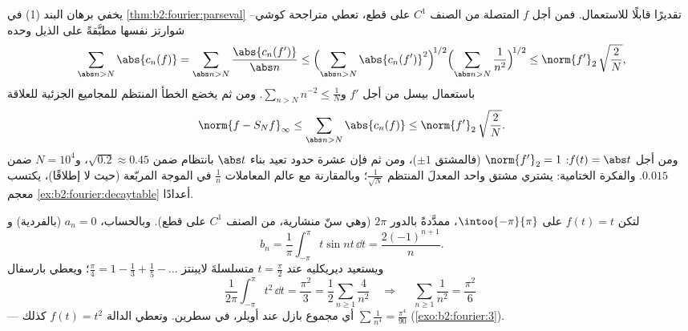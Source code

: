 \begin{example}\label{ex:b2:fourier:tailbound}
يخفي برهان البند (1) في \cref{thm:b2:fourier:parseval} تقديرًا
قابلًا للاستعمال. فمن أجل $f$ المتصلة من الصنف $C^1$ على قطع، تعطي متراجحة
كوشي--شوارتز نفسها مطبَّقةً على الذيل وحده
\[
\sum_{\abs n > N}\abs{c_n(f)}
= \sum_{\abs n > N}\frac{\abs{c_n(f')}}{\abs n}
\leq \Bigl(\sum_{\abs n > N}\abs{c_n(f')}^2\Bigr)^{\!1/2}
\Bigl(\sum_{\abs n>N}\frac{1}{n^2}\Bigr)^{\!1/2}
\leq \norm{f'}_2\,\sqrt{\frac{2}{N}} ,
\]
باستعمال بيسل من أجل $f'$ و$\sum_{n>N}n^{-2} \leq \frac1N$. ومن ثم
يخضع الخطأ المنتظم للمجاميع الجزئية للعلاقة
\[
\norm{f - S_Nf}_\infty
\leq \sum_{\abs n>N}\abs{c_n(f)}
\leq \norm{f'}_2\,\sqrt{\frac2N} .
\]
ومن أجل $f(t) = \abs t$: $\norm{f'}_2 = 1$ (فالمشتق
$\pm1$)، ومن ثم فإن عشرة حدود تعيد بناء $\abs t$ بانتظام
ضمن $\sqrt{0.2} \approx 0.45$، و$N = 10^4$ ضمن
$0.015$. والفكرة الختامية: يشتري مشتق واحد المعدلَ
المنتظم $\frac{1}{\sqrt N}$؛ وبالمقارنة مع عالم المعاملات
$\frac1n$ في الموجة المربّعة (حيث لا  إطلاقًا)،
يكتسب معجم \cref{ex:b2:fourier:decaytable} أعدادًا.
\end{example}

\begin{example}\label{ex:b2:fourier:basel}
لتكن $f(t) = t$ على $\intoo{-\pi}{\pi}$، ممدَّدةً بالدور $2\pi$
(وهي سنّ منشارية، من الصنف $C^1$ على قطع). وبالحساب، $a_n = 0$ (بالفردية) و
\[
b_n = \frac{1}{\pi}\int_{-\pi}^{\pi} t\sin nt\,\dd t
= \frac{2(-1)^{n+1}}{n} .
\]
ويستعيد ديريكليه عند $t = \frac\pi2$ متسلسلةَ لايبنتز $\frac\pi4 = 1 -
\frac13 + \frac15 - \dots$؛ ويعطي بارسفال
\[
\frac{1}{2\pi}\int_{-\pi}^{\pi} t^2\,\dd t = \frac{\pi^2}{3}
= \frac12\sum_{n\geq1}\frac{4}{n^2}
\quad\Longrightarrow\quad
\boxed{\;\sum_{n\geq1}\frac{1}{n^2} = \frac{\pi^2}{6}\;}
\]
--- أي مجموع بازل عند أويلر، في سطرين. وتعطي الدالة $f(t) = t^2$
كذلك $\sum \frac1{n^4} = \frac{\pi^4}{90}$
(\cref{exo:b2:fourier:3}).
\end{example}

